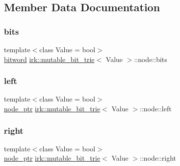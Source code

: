 \subsection{Member Data Documentation}
\mbox{\label{structirk_1_1mutable__bit__trie_1_1node_a8b55d968fa4274a91a6395ea1b9785a8}} 
\subsubsection{\texorpdfstring{bits}{bits}}
{\footnotesize\ttfamily template$<$class Value = bool$>$ \\
\mbox{\hyperlink{namespaceirk_a5d1a67079cf6423ecaededebe848f083}{bitword}} \mbox{\hyperlink{classirk_1_1mutable__bit__trie}{irk\+::mutable\+\_\+bit\+\_\+trie}}$<$ Value $>$\+::node\+::bits}

\mbox{\label{structirk_1_1mutable__bit__trie_1_1node_af59565476fb0ce3e3e3d57edbd8ca1de}} 
\subsubsection{\texorpdfstring{left}{left}}
{\footnotesize\ttfamily template$<$class Value = bool$>$ \\
\mbox{\hyperlink{classirk_1_1mutable__bit__trie_abd23179ac4f02a981d4f47b4c0652287}{node\+\_\+ptr}} \mbox{\hyperlink{classirk_1_1mutable__bit__trie}{irk\+::mutable\+\_\+bit\+\_\+trie}}$<$ Value $>$\+::node\+::left}

\mbox{\label{structirk_1_1mutable__bit__trie_1_1node_ad75512c087c6adaf342b9c62fd115f55}} 
\subsubsection{\texorpdfstring{right}{right}}
{\footnotesize\ttfamily template$<$class Value = bool$>$ \\
\mbox{\hyperlink{classirk_1_1mutable__bit__trie_abd23179ac4f02a981d4f47b4c0652287}{node\+\_\+ptr}} \mbox{\hyperlink{classirk_1_1mutable__bit__trie}{irk\+::mutable\+\_\+bit\+\_\+trie}}$<$ Value $>$\+::node\+::right}

